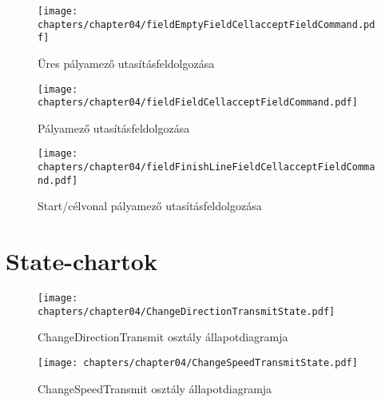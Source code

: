 \begin{figure}[h]
	\begin{center}
		\texttt{[image: chapters/chapter04/fieldEmptyFieldCellacceptFieldCommand.pdf]}
		\caption{Üres pályamező utasításfeldolgozása}
		\label{fig:field.EmptyFieldCell.accept}
	\end{center}
\end{figure}

\begin{figure}[h]
	\begin{center}
		\texttt{[image: chapters/chapter04/fieldFieldCellacceptFieldCommand.pdf]}
		\caption{Pályamező utasításfeldolgozása}
		\label{fig:field.FieldCell.accept}
	\end{center}
\end{figure}

\begin{figure}[h]
	\begin{center}
		\texttt{[image: chapters/chapter04/fieldFinishLineFieldCellacceptFieldCommand.pdf]}
		\caption{Start/célvonal pályamező utasításfeldolgozása}
		\label{fig:field.FinishLineFieldCell.accept}
	\end{center}
\end{figure}

\clearpage

\section{State-chartok}
\begin{figure}[h]
	\begin{center}
		\texttt{[image: chapters/chapter04/ChangeDirectionTransmitState.pdf]}
		\caption{ChangeDirectionTransmit osztály állapotdiagramja}
		\label{fig:state.ChangeDirectionTransmit}
	\end{center}
\end{figure}

\begin{figure}[h]
	\begin{center}
		\texttt{[image: chapters/chapter04/ChangeSpeedTransmitState.pdf]}
		\caption{ChangeSpeedTransmit osztály állapotdiagramja}
		\label{fig:state.ChangeSpeedTransmit}
	\end{center}
\end{figure}

\clearpage